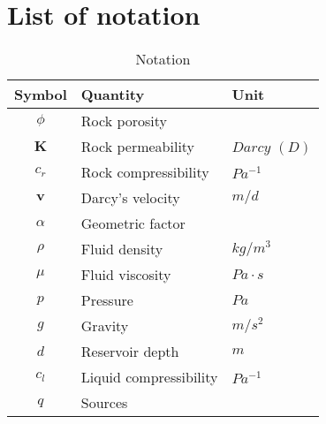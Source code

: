 \documentclass[12pt]{article}
\numberwithin{equation}{section}
\begin{document}
\newpage
\newpage



\newpage
\newpage
\appendix
\section{List of notation}\label{a1}

\begin{table}[!h]
\centering
\begin{tabular}{c l l }
\hline
Symbol & Quantity & Unit \\[0.5ex]
\hline
$\phi$ & Rock porosity&   \\
 $\mathbf{K}$& Rock permeability&  $Darcy$ $(D)$ \\
 $c_r$& Rock compressibility&  $Pa^{-1}$ \\
$\mathbf{v}$ & Darcy's velocity& $ m/d$ \\
 $\alpha$& Geometric factor&   \\
$\rho$ &Fluid density &  $kg/m^3$ \\
 $\mu$&Fluid viscosity & $Pa \cdot s$   \\
${p}$  &Pressure &  $Pa$ \\
$g$  &Gravity &  $m/s^2$ \\
$d$ & Reservoir depth&  $m$ \\
$c_l$ &Liquid compressibility &  $Pa^{-1}$ \\
$q$ &Sources &   \\
\hline
\end{tabular}\label{table:symbols}
\caption{Notation}
\end{table}
\newpage
\end{document}
